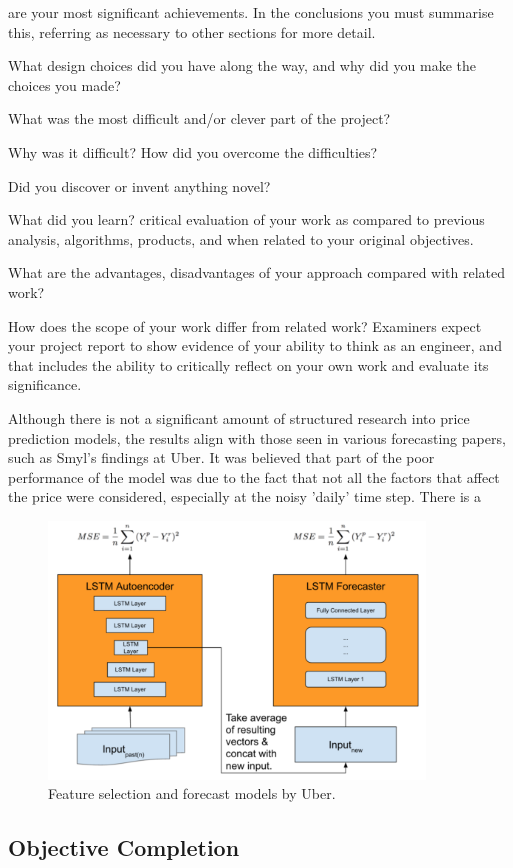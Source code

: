 \documentclass[10pt,onecolumn,letterpaper]{article}
\begin{document}
are your most significant achievements. In the conclusions you must summarise this, referring as necessary to other sections for more detail.

What design choices did you have along the way, and why did you make the choices you made?

What was the most difficult and/or clever part of the project?

Why was it difficult? How did you overcome the difficulties?

Did you discover or invent anything novel?

What did you learn? critical evaluation of your work as compared to previous analysis, algorithms, products, and when related to your original objectives.

What are the advantages, disadvantages of your approach compared with related work? 

How does the scope of your work differ from related work? Examiners expect your project report to show evidence of your ability to think as an engineer, and that includes the ability to critically reflect on your own work and evaluate its significance. 
\fi

Although there is not a significant amount of structured research into price prediction models, the results align with those seen in various forecasting papers, such as Smyl's findings at Uber. It was believed that part of the poor performance of the model was due to the fact that not all the factors that affect the price were considered, especially at the noisy 'daily' time step. There is a 

\begin{figure}[!hbt!]
\centering
\includegraphics[width=10cm]{uber_architecture}
\caption{Feature selection and forecast models by Uber.}
\end{figure}

\subsection{Objective Completion}
\end{document}

